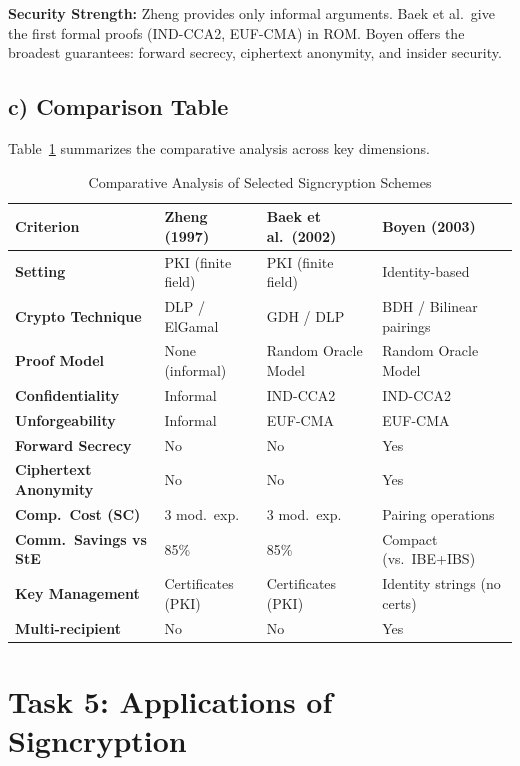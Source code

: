 \documentclass[11pt,a4paper]{article}
\begin{document}
\textbf{Security Strength:} Zheng provides only informal arguments. Baek et al.\ give the first formal proofs (IND-CCA2, EUF-CMA) in ROM. Boyen offers the broadest guarantees: forward secrecy, ciphertext anonymity, and insider security.

\subsection{c) Comparison Table}

Table~\ref{tab:comparison} summarizes the comparative analysis across key dimensions.

\begin{table}[htbp]
\centering
\caption{Comparative Analysis of Selected Signcryption Schemes}
\label{tab:comparison}
\small
\begin{tabular}{@{}p{2.8cm}p{3.5cm}p{3.5cm}p{3.5cm}@{}}
\toprule
\textbf{Criterion} & \textbf{Zheng (1997)} & \textbf{Baek et al.\ (2002)} & \textbf{Boyen (2003)} \\
\midrule
\textbf{Setting} & PKI (finite field) & PKI (finite field) & Identity-based \\
\textbf{Crypto Technique} & DLP / ElGamal & GDH / DLP & BDH / Bilinear pairings \\
\textbf{Proof Model} & None (informal) & Random Oracle Model & Random Oracle Model \\
\textbf{Confidentiality} & Informal & IND-CCA2 & IND-CCA2 \\
\textbf{Unforgeability} & Informal & EUF-CMA & EUF-CMA \\
\textbf{Forward Secrecy} & No & No & Yes \\
\textbf{Ciphertext Anonymity} & No & No & Yes \\
\textbf{Comp.\ Cost (SC)} & 3 mod.\ exp. & 3 mod.\ exp. & Pairing operations \\
\textbf{Comm.\ Savings vs StE} & 85\% & 85\% & Compact (vs.\ IBE+IBS) \\
\textbf{Key Management} & Certificates (PKI) & Certificates (PKI) & Identity strings (no certs) \\
\textbf{Multi-recipient} & No & No & Yes \\
\bottomrule
\end{tabular}
\end{table}

\section{Task 5: Applications of Signcryption}
\end{document}
